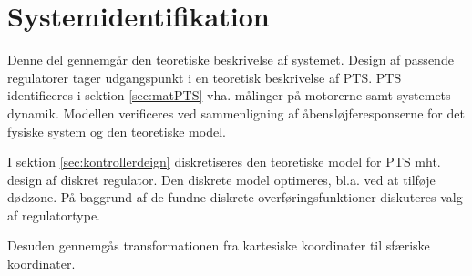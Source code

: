 \part{Systemidentifikation}
Denne del gennemgår den teoretiske beskrivelse af systemet.
Design af passende regulatorer tager udgangspunkt i en teoretisk beskrivelse af PTS.
PTS identificeres i sektion \ref{sec:matPTS} vha. målinger på motorerne samt systemets dynamik. 
Modellen verificeres ved sammenligning af åbensløjferesponserne for det fysiske system og den teoretiske model.

I sektion \ref{sec:kontrollerdeign} diskretiseres den teoretiske model for PTS mht. design af diskret regulator.
Den diskrete model optimeres, bl.a. ved at tilføje dødzone. 
På baggrund af de fundne diskrete overføringsfunktioner diskuteres valg af regulatortype. 

Desuden gennemgås transformationen fra kartesiske koordinater til sfæriske koordinater.
%
%

